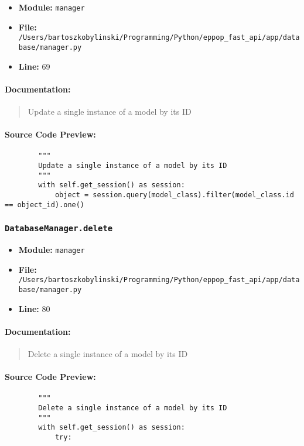 \documentclass[11pt,a4paper]{article}
\begin{document}
\begin{itemize}
    \item \textbf{Module:} \texttt{manager}
    \item \textbf{File:} \texttt{/Users/bartoszkobylinski/Programming/Python/eppop\_fast\_api/app/database/manager.py}
    \item \textbf{Line:} 69
\end{itemize}

\paragraph{Documentation:}
\begin{quote}
Update a single instance of a model by its ID
\end{quote}

\paragraph{Source Code Preview:}
\begin{verbatim}
        """
        Update a single instance of a model by its ID
        """
        with self.get_session() as session:
            object = session.query(model_class).filter(model_class.id == object_id).one()
\end{verbatim}

\vspace{1em}
\subsubsection{\texttt{DatabaseManager.delete}}

\begin{itemize}
    \item \textbf{Module:} \texttt{manager}
    \item \textbf{File:} \texttt{/Users/bartoszkobylinski/Programming/Python/eppop\_fast\_api/app/database/manager.py}
    \item \textbf{Line:} 80
\end{itemize}

\paragraph{Documentation:}
\begin{quote}
Delete a single instance of a model by its ID
\end{quote}

\paragraph{Source Code Preview:}
\begin{verbatim}
        """
        Delete a single instance of a model by its ID
        """
        with self.get_session() as session:
            try:
\end{verbatim}
\end{document}

